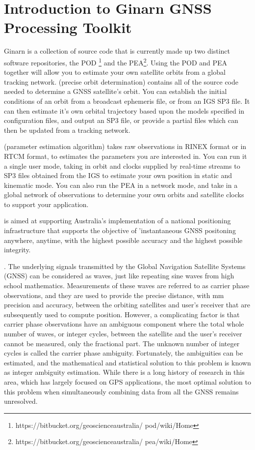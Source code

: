 \chapter{Introduction to Ginarn GNSS Processing Toolkit}
\label{ch:introduction}
%


Ginarn is a collection of source code that is currently made up two distinct software repositories, the POD \footnote[][]{https://bitbucket.org/geoscienceaustralia/ pod/wiki/Home} and the PEA\footnote[][]{https://bitbucket.org/geoscienceaustralia/ pea/wiki/Home}.
Using the POD and PEA together will allow you to estimate your own satellite orbits from a global tracking network.
 (precise orbit determination) contains all of the source code needed to determine a GNSS satellite's orbit. You can establish the initial conditions of an orbit from a broadcast ephemeris file, or from an IGS SP3 file. It can then estimate it's own orbital trajectory based upon the models specified in configuration files, and output an SP3 file, or provide a partial files which can then be updated from a tracking network. 



 (parameter estimation algorithm) takes raw observations in RINEX format or in RTCM format, to estimates the parameters you are interested in. You can run it a single user mode, taking in orbit and clocks supplied by real-time streams to SP3 files obtained from the IGS to estimate your own position in static and kinematic mode. 
You can also run the PEA in a network mode, and take in a global network of observations to determine your own orbits and satellite clocks to support your application.

 is aimed at supporting Australia's implementation of a national positioning infrastructure that supports the objective of 'instantaneous GNSS positoning anywhere, anytime, with the highest possible accuracy and the highest possible integrity.

. The underlying signals transmitted by the Global Navigation Satellite Systems (GNSS) can be considered as waves, just like repeating sine waves from high school mathematics. Measurements of these waves are referred to as carrier phase observations, and they are used to provide the precise distance, with mm precision and accuracy, between the orbiting satellites and user’s receiver that are subsequently used to compute position. However, a complicating factor is that carrier phase observations have an ambiguous component where the total whole number of waves, or integer cycles, between the satellite and the user’s receiver cannot be measured, only the fractional part. The unknown number of integer cycles is called the carrier phase ambiguity. Fortunately, the ambiguities can be estimated, and the mathematical and statistical solution to this problem is known as integer ambiguity estimation. While there is a long history of research in this area, which has largely focused on GPS applications, the most optimal solution to this problem when simultaneously combining data from all the GNSS remains unresolved.

